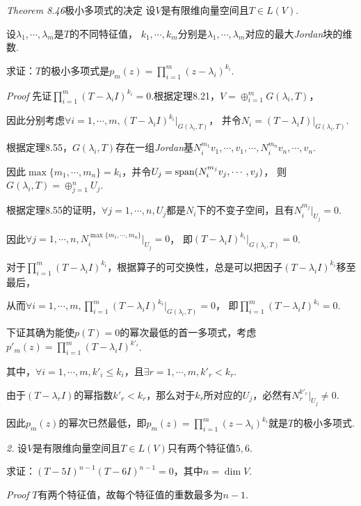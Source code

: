 \textit{Theorem 8.46}{\kaishu 极小多项式的决定}
设\(V\)是有限维向量空间且\(T \in L(V)\).

设\(\lambda_1,\cdots,\lambda_m\)是\(T\)的不同特征值，
\(k_1,\cdots,k_m\)分别是\(\lambda_1,\cdots,\lambda_m\)对应的最大\textit{Jordan}块的维数.

求证：\(T\)的极小多项式是\(p_m(z)=\prod_{i=1}^m (z-\lambda_i)^{k_i}\).

\textit{Proof}
先证\(\prod_{i=1}^m (T-\lambda_i I)^{k_i}=0\).根据定理8.21，\(V=\oplus_{i=1}^m G(\lambda_i,T)\)，

因此分别考虑\(\forall i=1,\cdots,m,(T-\lambda_i I)^{k_i}|_{G(\lambda_i,T)}\)，
并令\(N_i=(T-\lambda_i I)|_{G(\lambda_i,T)}\).

根据定理8.55，\(G(\lambda_i,T)\)存在一组\textit{Jordan}基\(N_i^{m_1}v_1,\cdots,v_1,\cdots,N_i^{m_n}v_n,\cdots,v_n\).

因此\(\max \{m_1,\cdots,m_n\}=k_i\)，并令\(U_j=\mathrm{span} (N_i^{m_j}v_j,\cdots,v_j)\)，
则\(G(\lambda_i,T)=\oplus_{j=1}^n U_j\).

根据定理8.55的证明，\(\forall j=1,\cdots,n,U_j\)都是\(N_i\)下的不变子空间，且有\(N_i^{m_j}|_{U_j}=0\).

因此\(\forall j=1,\cdots,n,N_i^{\max \{m_1,\cdots,m_n\}}|_{U_j}=0\)，
即\((T-\lambda_i I)^{k_i}|_{G(\lambda_i,T)}=0\).

对于\(\prod_{i=1}^m (T-\lambda_i I)^{k_i}\)，根据算子的可交换性，总是可以把因子\((T-\lambda_i I)^{k_i}\)移至最后，

从而\(\forall i=1,\cdots,m,\prod_{i=1}^m (T-\lambda_i I)^{k_i}|_{G(\lambda_i,T)}=0\)，
即\(\prod_{i=1}^m (T-\lambda_i I)^{k_i}=0\).

下证其确为能使\(p(T)=0\)的幂次最低的首一多项式，考虑\(p'_m(z)=\prod_{i=1}^m (T-\lambda_i I)^{k'_i}\).

其中，\(\forall i=1,\cdots,m,k'_i \leq k_i\)，且\(\exists r=1,\cdots,m,k'_r<k_r\).

由于\((T-\lambda_r I)\)的幂指数\(k'_r<k_r\)，那么对于\(k_r\)所对应的\(U_j\)，必然有\(N_r^{k'_r}|_{U_j} \ne 0\).

因此\(p_m(z)\)的幂次已然最低，即\(p_m(z)=\prod_{i=1}^m (z-\lambda_i)^{k_i}\)就是\(T\)的极小多项式.

\hspace*{\fill}

\textit{2.}
设\(V\)是有限维向量空间且\(T \in L(V)\)只有两个特征值\(5,6\).

求证：\((T-5I)^{n-1}(T-6I)^{n-1}=0\)，其中\(n=\dim V\).

\textit{Proof}
\(T\)有两个特征值，故每个特征值的重数最多为\(n-1\).

